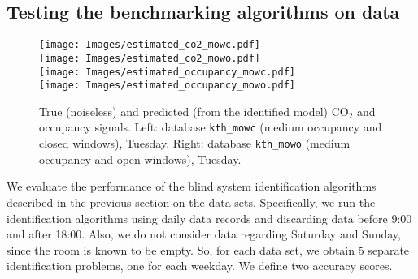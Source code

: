 \documentclass{article}
\begin{document}
\subsection{Testing the benchmarking algorithms on data}
\begin{figure*}[htb]\label{fig:co2_test}
\centering
\texttt{[image: Images/estimated\_co2\_mowc.pdf]}\\
\texttt{[image: Images/estimated\_co2\_mowo.pdf]}\\
\texttt{[image: Images/estimated\_occupancy\_mowc.pdf]}\\
\texttt{[image: Images/estimated\_occupancy\_mowo.pdf]}
\caption{True (noiseless) and predicted (from the identified model) CO$_2$ and occupancy signals. Left: database \texttt{kth\_mowc} (medium occupancy and closed windows), Tuesday. Right: database \texttt{kth\_mowo} (medium occupancy and open windows), Tuesday.}
\label{fig:room_CO2_concentration}
\end{figure*}
We evaluate the performance of the blind system identification algorithms described in the previous section on the data sets. Specifically, we run the identification algorithms using daily data records and discarding data before 9:00 and after 18:00. Also, we do not consider data regarding Saturday and Sunday, since the room is known to be empty. So, for each data set, we obtain 5 separate identification problems, one for each weekday. We define two accuracy scores.
\end{document}
